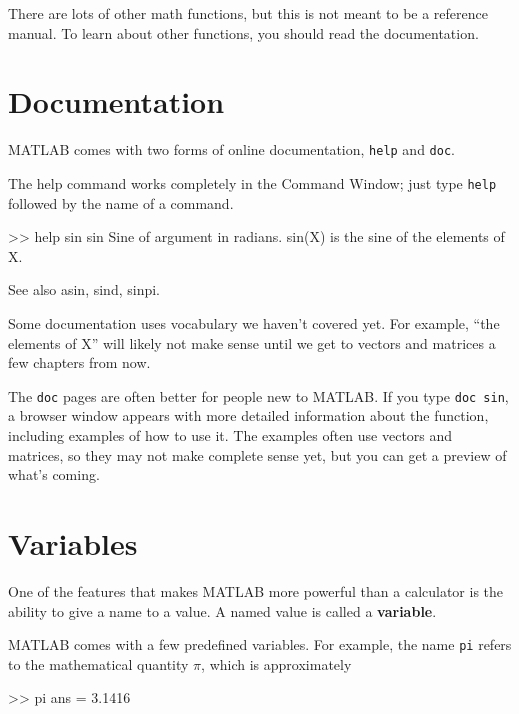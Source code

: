 \documentclass[
]{book}
\numberwithin{Answer}{chapter}
\numberwithin{Exercise}{chapter}
\begin{document}
There are lots of other math functions, but this is not meant to
be a reference manual.  To learn about other functions, you should
read the documentation.


\section{Documentation}

MATLAB comes with two forms of online documentation, {\tt help}
and {\tt doc}.


The help command works completely in the Command Window; just 
type {\tt help} followed by the name of a command.

\begin{code}
>> help sin
 sin    Sine of argument in radians.
    sin(X) is the sine of the elements of X.
 
    See also asin, sind, sinpi.
\end{code}

Some documentation uses vocabulary we haven't covered yet.  
For example, ``the elements of X'' will likely not make sense until
we get to vectors and matrices a few chapters from now.


The {\tt doc} pages are often better for people new to MATLAB.  
If you type {\tt doc sin}, a browser window appears with more detailed information about the function, including examples of how to use it.  The examples often
use vectors and matrices, so they may not make complete sense yet, 
but you can get a preview of what's coming.


\section{Variables}

One of the features that makes MATLAB more powerful than a calculator
is the ability to give a name to a value.  A named value is called
a {\bf variable}.

 
MATLAB comes with a few predefined variables. For
example, the name {\tt pi} refers to the
mathematical quantity $\pi$, which is approximately

\begin{code}
>> pi
ans = 3.1416
\end{code}
\end{document}
